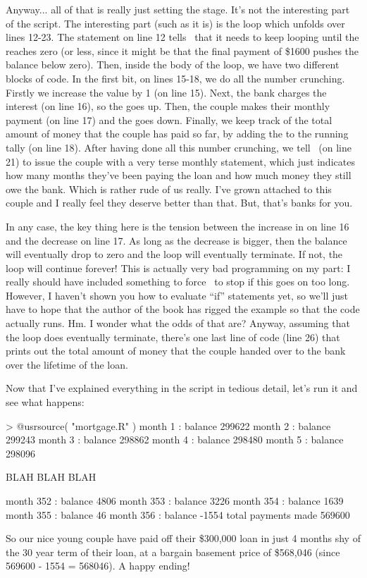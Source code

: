 Anyway... all of that is really just setting the stage. It's not the interesting part of the script. The interesting part (such as it is) is the loop which unfolds over lines 12-23. The  statement on line 12 tells \R\ that it needs to keep looping until the  reaches zero (or less, since it might be that the final payment of \$1600 pushes the balance below zero). Then, inside the body of the loop, we have two different blocks of code. In the first bit, on lines 15-18, we do all the number crunching. Firstly we increase the value  by 1 (on line 15). Next, the bank charges the interest (on line 16), so the  goes up. Then, the couple makes their monthly payment (on line 17) and the  goes down. Finally, we keep track of the total amount of money that the couple has paid so far, by adding the  to the running tally (on line 18). After having done all this number crunching, we tell \R\  (on line 21) to issue the couple with a very terse monthly statement, which just indicates how many months they've been paying the loan and how much money they still owe the bank. Which is rather rude of us really. I've grown attached to this couple and I really feel they deserve better than that. But, that's banks for you.

In any case, the key thing here is the tension between the increase in  on line 16 and the decrease on line 17. As long as the decrease is bigger, then the balance will eventually drop to zero and the loop will eventually terminate. If not, the loop will continue forever! This is actually very bad programming on my part: I really should have included something to force \R\ to stop if this goes on too long. However, I haven't shown you how to evaluate ``if'' statements yet, so we'll just have to hope that the author of the book has rigged the example so that the code actually runs. Hm. I wonder what the odds of that are? Anyway, assuming that the loop does eventually terminate, there's one last line of code (line 26) that prints out the total amount of money that the couple handed over to the bank over the lifetime of the loan. 

Now that I've explained everything in the script in tedious detail, let's run it and see what happens:
\begin{rblock1}
> @usr{source( "mortgage.R" )}
month 1 : balance 299622 
month 2 : balance 299243 
month 3 : balance 298862 
month 4 : balance 298480 
month 5 : balance 298096 

BLAH BLAH BLAH

month 352 : balance 4806 
month 353 : balance 3226 
month 354 : balance 1639 
month 355 : balance 46 
month 356 : balance -1554 
total payments made 569600 
\end{rblock1}
So our nice young couple have paid off their \$300,000 loan in just 4 months shy of the 30 year term of their loan, at a bargain basement price of \$568,046 (since  569600 - 1554 = 568046). A happy ending!


